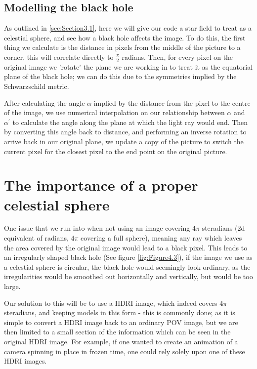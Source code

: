 \documentclass[oneside,openright,frontopenright, singlespacing]{dmathesis}
\begin{document}
\subsection{Modelling the black hole}\label{subsec:Subsection3.5.4}
	
	As outlined in \ref{sec:Section3.1}, here we will give our code a star field to treat as a celestial sphere, and see how a black hole affects the image. To do this, the first thing we calculate is the distance in pixels from the middle of the picture to a corner, this will correlate directly to $\frac{\pi}{2}$ radians. Then, for every pixel on the original image we 'rotate' the plane we are working in to treat it as the equatorial plane of the black hole; we can do this due to the symmetries implied by the Schwarzschild metric. 

\vspace{1em}
	After calculating the angle $\alpha$ implied by the distance from the pixel to the centre of the image, we use numerical interpolation on our relationship between $\alpha$ and $\alpha^{'}$ to calculate the angle along the plane at which the light ray would end. Then by converting this angle back to distance, and performing an inverse rotation to arrive back in our original plane, we update a copy of the picture to switch the current pixel for the closest pixel to the end point on the original picture.

\section{The importance of a proper celestial sphere}\label{subsec:Subsection3.5.5}

	One issue that we run into when not using an image covering $4\pi$ steradians (2d equivalent of radians, $4\pi$ covering a full sphere), meaning any ray which leaves the area covered by the original image would lead to a black pixel. This leads to an irregularly shaped black hole (See figure \ref{fig:Figure4.3}), if the image we use as a celestial sphere is circular, the black hole would seemingly look ordinary, as the irregularities would be smoothed out horizontally and vertically, but would be too large. 

\vspace{1em}
	Our solution to this will be to use a HDRI image, which indeed covers $4\pi$ steradians, and keeping models in this form - this is commonly done; as it is simple to convert a HDRI image back to an ordinary POV image, but we are then limited to a small section of the information which can be seen in the original HDRI image. For example, if one wanted to create an animation of a camera spinning in place in frozen time, one could rely solely upon one of these HDRI images.
\end{document}
